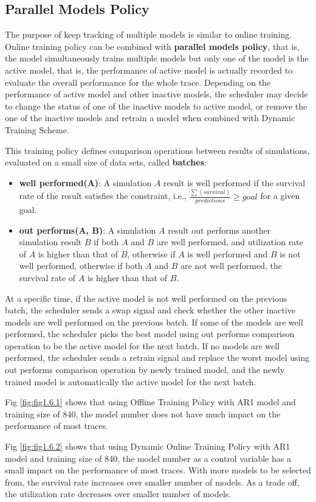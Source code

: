 \documentclass{article}
\begin{document}
\subsection{Parallel Models Policy}

\begin{flushleft}
The purpose of keep tracking of multiple models is similar to online training. Online training policy can be combined with \textbf{parallel models policy}, that is, the model simultaneously trains multiple models but only one of the model is the active model, that is, the performance of active model is actually recorded to evaluate the overall performance for the whole trace. Depending on the performance of active model and other inactive models, the scheduler may decide to change the status of one of the inactive models to active model, or remove the one of the inactive models and retrain a model when combined with Dynamic Training Scheme.

This training policy defines comparison operations between results of simulations, evaluated on a small size of data sets, called \textbf{batches}:

\begin{itemize}
    \item \textbf{well performed(A)}: A simulation $A$ result is well performed if the survival rate of the result satisfies the constraint, i.e., $\frac{\sum(survival)}{predictions} \geq goal$ for a given goal.
    \item \textbf{out performs(A, B)}: A simulation $A$ result out performs another simulation result $B$ if both $A$ and $B$ are well performed, and utilization rate of $A$ is higher than that of $B$, otherwise if $A$ is well performed and $B$ is not well performed, otherwise if both $A$ and $B$ are not well performed, the survival rate of $A$ is higher than that of $B$.
\end{itemize}

At a specific time, if the active model is not well performed on the previous batch, the scheduler sends a swap signal and check whether the other inactive models are well performed on the previous batch. If some of the models are well performed, the scheduler picks the best model using out performs comparison operation to be the active model for the next batch. If no models are well performed, the scheduler sends a retrain signal and replace the worst model using out performs comparison operation by newly trained model, and the newly trained model is automatically the active model for the next batch.

Fig \ref{fig:fig1.6.1} shows that using Offline Training Policy with AR1 model and training size of 840, the model number does not have much impact on the performance of most traces.

Fig \ref{fig:fig1.6.2} shows that using Dynamic Online Training Policy with AR1 model and training size of 840, the model number as a control variable has a small impact on the performance of most traces. With more models to be selected from, the survival rate increases over smaller number of models. As a trade off, the utilization rate decreases over smaller number of models.
\end{flushleft}
\end{document}
